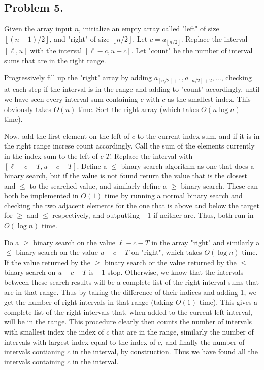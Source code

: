 \documentclass[12pt]{article}
\theoremstyle{definitionstyle}
\newcommand{\floor}[1]{\left\lfloor#1\right\rfloor}
\begin{document}
    \subsection*{Problem 5.}
    Given the array input $n$, initialize an empty array called "left" of size $\floor{(n-1)/2}$, and "right" of size $\floor{n/2}$. Let $c = a_{\floor{n/2}}$. Replace the interval $[\ell, u]$ with the interval $[\ell-c, u-c]$. Let "count" be the number of interval sums that are in the right range. 
    
    Progressively fill up the "right" array by adding $a_{\floor{n/2}+1}, a_{\floor{n/2}+2}, \ldots$, checking at each step if the interval is in the range and adding to "count" accordingly, until we have seen every interval sum containing $c$ with $c$ as the smallest index. This obviously takes $O(n)$ time. Sort the right array (which takes $O(n\log n)$ time). 
    
    Now, add the first element on the left of $c$ to the current index sum, and if it is in the right range increse count accordingly. Call the sum of the elements currently in the index sum to the left of $c$ $T$. Replace the interval with $[\ell-c-T, u-c-T]$. Define a $\leq$ binary search algorithm as one that does a binary search, but if the value is not found return the value that is the closest and $\leq$ to the searched value, and similarly define a $\geq$ binary search. These can both be implemented in $O(1)$ time by running a normal binary search and checking the two adjacent elements for the one that is above and below the target for $\geq$ and $\leq$ respectively, and outputting $-1$ if neither are. Thus, both run in $O(\log n)$ time.
    
    Do a $\geq$ binary search on the value $\ell-c-T$ in the array "right" and similarly a $\leq$ binary search on the value $u-c-T$ on "right", which takes $O(\log n)$ time. If the value returned by the $\geq$ binary search or the value returned by the $\leq$ binary search on $u-c-T$ is $-1$ stop. Otherwise, we know that the intervals between these search results will be a complete list of the right interval sums that are in that range. Thus by taking the difference of their indices and adding 1, we get the number of right intervals in that range (taking $O(1)$ time). This gives a complete list of the right intervals that, when added to the current left interval, will be in the range. This procedure clearly then counts the number of intervals with smallest index the index of $c$ that are in the range, similarly the number of intervals with largest index equal to the index of $c$, and finally the number of intervals contianing $c$ in the interval, by construction. Thus we have found all the intervals containing $c$ in the interval. 
    
\end{document}
